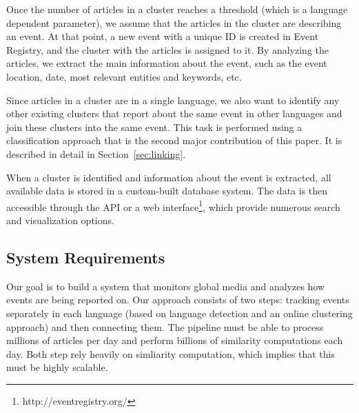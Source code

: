 \documentclass[twoside,11pt]{article}
\begin{document}
Once the number of articles in a cluster reaches a threshold (which is a language dependent parameter), we assume that the articles in the cluster are describing an event. At that point, a new event with a unique ID is created in Event Registry, and the cluster with the articles is assigned to it. By analyzing the articles, we extract the main information about the event, such as the event location, date, most relevant entities and keywords, etc.

Since articles in a cluster are in a single language, we also want to identify any other existing clusters that report about the same event in other languages and join these clusters into the same event. This task is performed using a classification approach that is the second major contribution of this paper. It is described in detail in Section~\ref{sec:linking}.

When a cluster is identified and information about the event is extracted, all available data is stored in a custom-built database system. The data is then accessible through the API or a web interface\footnote{http://eventregistry.org/}, which provide numerous search and visualization options.


\subsection{System Requirements}
\label{sec:sysreq}

Our goal is to build a system that monitors global media and analyzes how events are being reported on. Our approach consists of two steps: tracking events separately in each language (based on language detection and an online clustering approach) and then connecting them. The pipeline must be able to process millions of articles per day and perform billions of similarity computations each day. Both step rely heavily on simliarity computation, which implies that this must be highly scalable.
\end{document}
